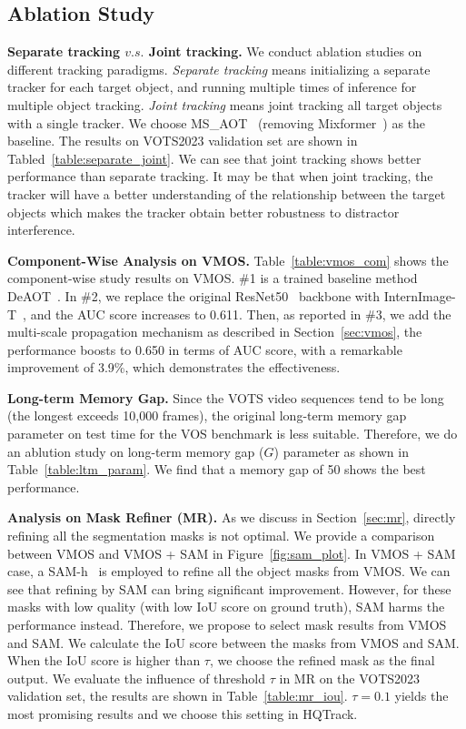 \documentclass[10pt,twocolumn,letterpaper]{article}
\begin{document}
\subsection{Ablation Study}

\noindent\textbf{Separate tracking $v.s.$ Joint tracking.}
We conduct ablation studies on different tracking paradigms. 
\textit{Separate tracking} means initializing a separate tracker for each target object, and running multiple times of inference for multiple object tracking.
\textit{Joint tracking} means joint tracking all target objects with a single tracker.
We choose MS\_AOT~\cite{vot22} (removing Mixformer~\cite{mixformer}) as the baseline.
The results on VOTS2023 validation set are shown in Tabled~\ref{table:separate_joint}.
We can see that joint tracking shows better performance than separate tracking.
It may be that when joint tracking, the tracker will have a better understanding of the relationship between the target objects which makes the tracker obtain better robustness to distractor interference.

\noindent\textbf{Component-Wise Analysis on VMOS.}
Table~\ref{table:vmos_com} shows the component-wise study results on VMOS.
\#1 is a trained baseline method DeAOT~\cite{deaot}.
In \#2, we replace the original ResNet50~\cite{resnet} backbone with InternImage-T~\cite{internimage}, and the AUC score increases to 0.611.
Then, as reported in \#3, we add the multi-scale propagation mechanism as described in Section~\ref{sec:vmos}, the performance boosts to 0.650 in terms of AUC score, with a remarkable improvement of 3.9\%, which demonstrates the effectiveness.

\noindent\textbf{Long-term Memory Gap.}
Since the VOTS video sequences tend to be long (the longest exceeds 10,000 frames), the original long-term memory gap parameter on test time for the VOS benchmark is less suitable. 
Therefore, we do an ablution study on long-term memory gap ($G$) parameter as shown in Table~\ref{table:ltm_param}. 
We find that a memory gap of 50 shows the best performance.

\noindent\textbf{Analysis on Mask Refiner (MR).}
As we discuss in Section~\ref{sec:mr}, directly refining all the segmentation masks is not optimal. We provide a comparison between VMOS and VMOS + SAM in Figure~\ref{fig:sam_plot}. In VMOS + SAM case, a SAM-h~\cite{sam} is employed to refine all the object masks from VMOS. 
We can see that refining by SAM can bring significant improvement. However, for these masks with low quality (with low IoU score on ground truth), SAM harms the performance instead.
Therefore, we propose to select mask results from VMOS and SAM. We calculate the IoU score between the masks from VMOS and SAM. When the IoU score is higher than $\tau$, we choose the refined mask as the final output. 
We evaluate the influence of threshold $\tau$ in MR on the VOTS2023 validation set, the results are shown in Table~\ref{table:mr_iou}.
$\tau=0.1$ yields the most promising results and we choose this setting in HQTrack.
\end{document}
